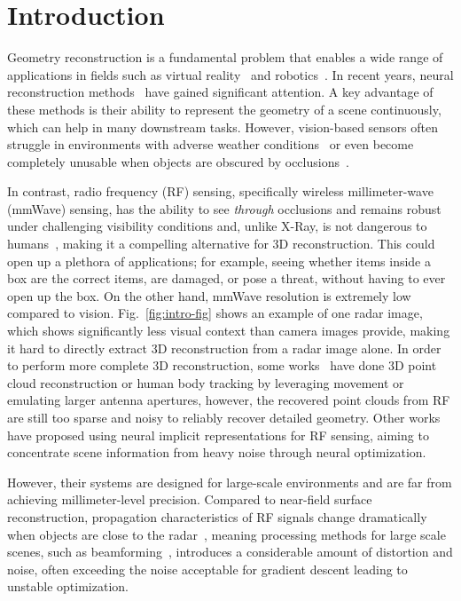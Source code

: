 \section{Introduction}
\label{sec:intro}

Geometry reconstruction is a fundamental problem that enables a wide range of applications 
in fields such as virtual reality~\cite{dong2025digital, guo2025articulatedgs, li2025single} and robotics~\cite{heppert2023carto, kerr2024robot}.  
In recent years, neural reconstruction methods~\cite{wang2021neus, takikawa2021neural, muller2022instant, 
munkberg2022extracting, liu2023nero} have gained significant attention.  
A key advantage of these methods is their ability to represent the geometry of a scene continuously, which can help in many downstream tasks.
However, vision-based sensors often struggle in environments with adverse weather 
conditions~\cite{zhao2018rf, guan2020through, madani2022radatron, liu2023echoes} 
or even become completely unusable when objects are obscured by 
occlusions~\cite{adib2013see, zhao2018through, zhao2019through, korany2019xmodal, yanik2019near, dodds2025mito, dodds2024around}. 


In contrast, radio frequency (RF) sensing, specifically wireless millimeter-wave (mmWave) sensing, has the ability to see \textit{through} occlusions 
and remains robust under challenging visibility conditions
and, unlike X-Ray, is not dangerous to humans~\cite{wu2015safe}, making it a compelling alternative for 3D reconstruction.
This could open up a plethora of applications; for example, seeing whether items inside a box are the correct items, are damaged, or pose a threat, without having to ever open up the box.
On the other hand, mmWave resolution is extremely low compared to vision. Fig.~\ref{fig:intro-fig} shows an example of one radar image, which shows significantly less visual context than camera images provide, making it hard to directly extract 3D reconstruction from a radar image alone.
In order to perform more complete 3D reconstruction, some works~\cite{adib2013see, zhao2018through, korany2019xmodal, yanik2019near, dodds2024around} 
have done 3D point cloud reconstruction or human body tracking by leveraging movement or emulating larger antenna apertures, however, the recovered point clouds from RF are still too sparse and noisy to reliably recover detailed geometry.
Other works~\cite{borts2024radar, huang2024dart} have proposed using neural implicit representations for RF sensing, aiming to concentrate scene information from heavy noise through neural optimization.

However, their systems are designed for large-scale environments and are far from achieving millimeter-level precision.
Compared to near-field surface reconstruction, propagation characteristics of RF signals change dramatically when objects are close to the radar~\cite{yanik2019near,sheen2001three}, meaning processing methods for large scale scenes, such as beamforming~\cite{benesty2008conventional}, introduces a considerable amount of distortion and noise, often exceeding the noise acceptable for gradient descent leading to unstable optimization.

